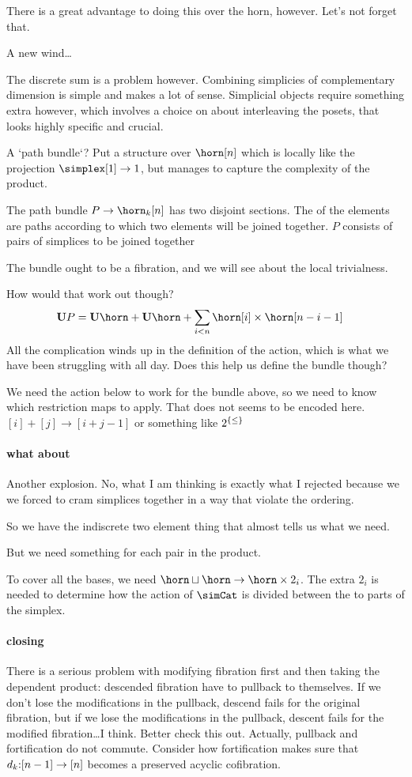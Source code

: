 \documentclass[csh.tex]{subfiles}
\begin{document}
There is a great advantage to doing this over the horn, however. Let's not forget that.

A new wind\dots

The discrete sum is a problem however. Combining simplicies of complementary dimension is simple and makes a lot of sense. Simplicial objects require something extra however, which involves a choice on about  interleaving the posets, that looks highly specific and crucial.


A `path bundle`? Put a structure over $\horn[n]$ which is locally like the projection $\simplex[1]\to 1$, but manages to capture the complexity of the product.

The path bundle $P\to \horn_k[n]$ has two disjoint sections. The of the elements are paths according to which two elements will be joined together. $P$ consists of pairs of simplices to be joined together 

The bundle ought to be a fibration, and we will see about the local trivialness.

How would that work out though? 
\begin{align*}
\base P &= \base \horn + \base \horn + \sum_{i < n} \horn[i]\times\horn
[n-i-1]
\end{align*}
All the complication winds up in the definition of the action, which is what we have been struggling with all day. Does this help us define the bundle though?

We need the action below to work for the bundle above, so we need to know which restriction maps to apply. That does not seems to be encoded here.
$[i]+[j]\to [i+j-1]$ or something like $2^{\left\{\leq\right\}}$

\paragraph{what about}
Another explosion. No, what I am thinking is exactly what I rejected because we we forced to cram simplices together in a way that violate the ordering.

So we have the indiscrete two element thing that almost tells us what we need.

But we need something for each pair in the product.

To cover all the bases, we need $\horn \sqcup \horn \to \horn \times 2_i$. The extra $2_i$ is needed to determine how the action of $\simCat$ is divided between the to parts of the simplex. 


\paragraph{closing}
There is a serious problem with modifying fibration first and then taking the dependent product: descended fibration have to pullback to themselves. If we don't lose the modifications in the pullback, descend fails for the original fibration, but if we lose the modifications in the pullback, descent fails for the modified fibration\dots I think. Better check this out. 
Actually, pullback and fortification do not commute. Consider how fortification makes sure that $d_k\mathord :[n-1]\to[n]$ becomes a preserved acyclic cofibration.
\end{document}
